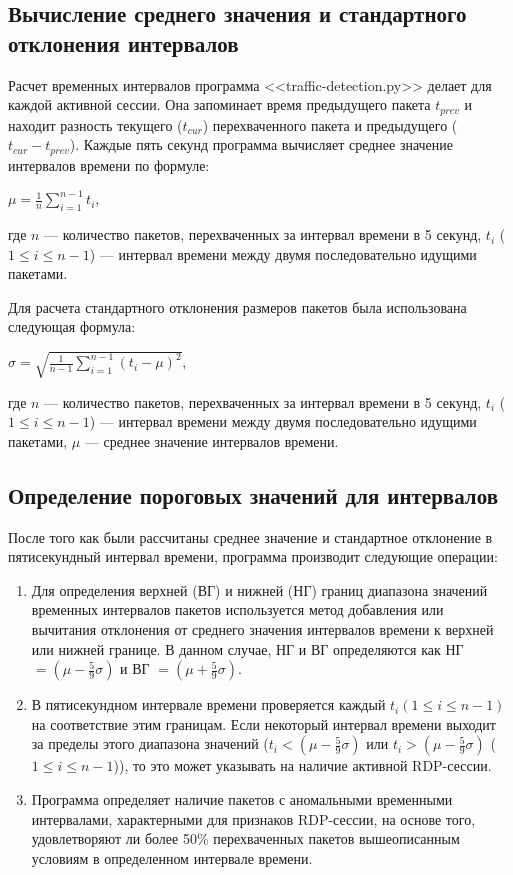 \documentclass[bachelor, och, coursework]{SCWorks}
\begin{document}
\subsection{Вычисление среднего значения и стандартного отклонения интервалов}
Расчет временных интервалов программа <<traffic-detection.py>> делает для каждой активной сессии. Она запоминает время предыдущего пакета $t_{prev}$ и 
находит разность текущего ($t_{cur}$) перехваченного пакета и предыдущего ($t_{cur} - t_{prev}$). Каждые пять секунд программа вычисляет 
среднее значение интервалов времени по формуле:

\begin{center}
  $\mu = \frac{1}{n}\sum_{i = 1}^{n - 1} t_{i}$,
\end{center}

где $n$ --- количество пакетов, перехваченных за интервал времени в 5 секунд, $t_i$ ($1 \leq i \leq n - 1$) --- интервал времени между двумя 
последовательно идущими пакетами.

Для расчета стандартного отклонения размеров пакетов была использована следующая формула:

\begin{center}
  $\sigma = \sqrt{\frac{1}{n - 1} \sum_{i = 1}^{n - 1} (t_{i} - \mu)^2}$,
\end{center}

где $n$ --- количество пакетов, перехваченных за интервал времени в 5 секунд, $t_i$ ($1 \leq i \leq n - 1$) --- интервал времени между двумя 
последовательно идущими пакетами, 
$\mu$ --- среднее значение интервалов времени.

\subsection{Определение пороговых значений для интервалов}


После того как были рассчитаны среднее значение и стандартное отклонение в пятисекундный интервал времени, программа производит следующие операции:

\begin{enumerate}
  \item Для определения верхней (ВГ) и нижней (НГ) границ диапазона значений временных интервалов пакетов используется метод добавления или 
  вычитания отклонения от среднего значения интервалов времени к верхней или нижней границе. В данном случае, НГ и ВГ определяются как 
  НГ $= (\mu - \frac{5}{9}\sigma)$ и ВГ $= (\mu + \frac{5}{9}\sigma)$. 
  \item В пятисекундном интервале времени проверяется каждый $t_i (1 \leq i \leq n - 1)$ на соответствие этим границам. 
  Если некоторый интервал времени выходит за пределы этого диапазона значений ($t_i < (\mu - \frac{5}{9}\sigma)$ или $t_i > (\mu - \frac{5}{9}\sigma)$ 
  ($1 \leq i \leq n - 1$)), то это может указывать на наличие активной RDP-сессии.
  \item Программа определяет наличие пакетов с аномальными временными интервалами, характерными для признаков RDP-сессии, на основе того, 
  удовлетворяют ли более 50\% перехваченных пакетов вышеописанным условиям в определенном интервале времени.
\end{enumerate}
\end{document}
